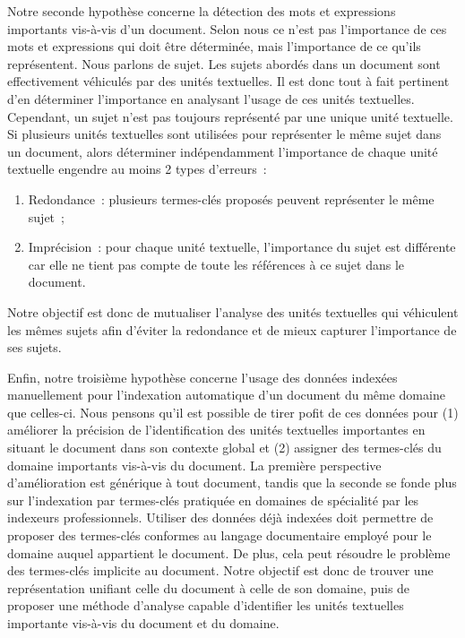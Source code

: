     Notre seconde hypothèse concerne la détection des mots et expressions
    importants vis-à-vis d'un document. Selon nous ce n'est pas l'importance de
    ces mots et expressions qui doit être déterminée, mais l'importance de ce
    qu'ils représentent. Nous parlons de sujet.
    Les sujets abordés dans un document sont effectivement véhiculés par des
    unités textuelles. Il est donc tout à fait pertinent d'en déterminer
    l'importance en analysant l'usage de ces unités textuelles. Cependant, un
    sujet n'est pas toujours représenté par une unique unité textuelle. Si
    plusieurs unités textuelles sont utilisées pour représenter le même sujet
    dans un document, alors déterminer indépendamment l'importance de chaque
    unité textuelle engendre au moins 2 types d'erreurs~:
    \begin{enumerate}
      \item{Redondance~: plusieurs termes-clés proposés peuvent représenter le
            même sujet~;}
      \item{Imprécision~: pour chaque unité textuelle, l'importance du sujet est
            différente car elle ne tient pas compte de toute les références à ce
            sujet dans le document.}
    \end{enumerate}
    Notre objectif est donc de mutualiser l'analyse des unités textuelles qui
    véhiculent les mêmes sujets afin d'éviter la redondance et de mieux capturer
    l'importance de ses sujets.
    
    Enfin, notre troisième hypothèse concerne l'usage des données indexées
    manuellement pour l'indexation automatique d'un document du même domaine que
    celles-ci. Nous pensons qu'il est possible de tirer pofit de ces données
    pour (1) améliorer la précision de l'identification des unités textuelles
    importantes en situant le document dans son contexte global et (2)
    assigner des termes-clés du domaine importants vis-à-vis du document.
    La première perspective d'amélioration est générique à tout document, tandis
    que la seconde se fonde plus sur l'indexation par termes-clés pratiquée en
    domaines de spécialité par les indexeurs professionnels. Utiliser des
    données déjà indexées doit permettre de proposer des termes-clés conformes
    au langage documentaire employé pour le domaine auquel appartient le
    document. De plus, cela peut résoudre le problème des termes-clés implicite
    au document.
    Notre objectif est donc de trouver une représentation unifiant celle du
    document à celle de son domaine, puis de proposer une méthode d'analyse
    capable d'identifier les unités textuelles importante vis-à-vis du document
    et du domaine.

